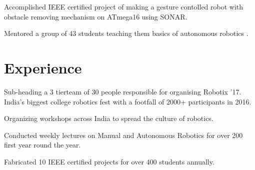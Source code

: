 \documentclass[letterpaper]{deedy-resume} %
\begin{document}
\begin{minipage}[t]{0.66\textwidth}

\begin{tightitemize}
\item Accomplished IEEE certified project of making a gesture contolled robot with obstacle removing mechanism on ATmega16 using SONAR.
\item Mentored a group of 43 students teaching them basics of autonomous robotics .
\end{tightitemize}

\sectionspace %



\section{Experience}


\begin{tightitemize}
\item Sub-heading a 3 tierteam of 30 people responsible for organising Robotix ’17. India’s biggest college robotics fest with a footfall of 2000+ participants in 2016.
\item Organizing workshops across India to spread the culture of robotics.

\end{tightitemize}

\sectionspace %



\begin{tightitemize}

\item Conducted weekly lectures on Manual and Autonomous Robotics for over 200 first year round the year.
\item Fabricated 10 IEEE certified projects for over 400 students annually.
\end{tightitemize}
\sectionspace %


\end{minipage}
\end{document}
